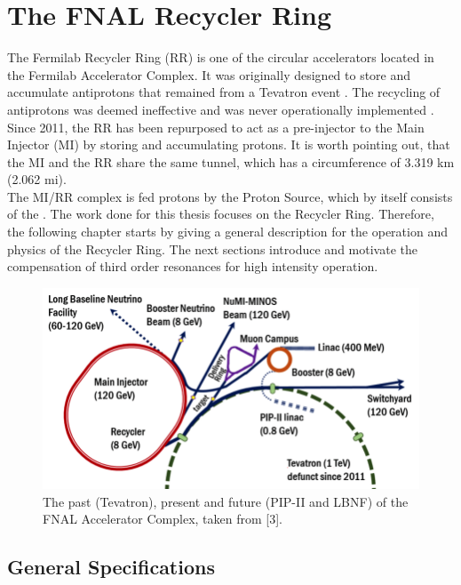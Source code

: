 \chapter{The FNAL Recycler Ring}

The Fermilab Recycler Ring (RR) is one of the circular accelerators located in the Fermilab Accelerator Complex. It was originally designed to store and accumulate antiprotons that remained from a Tevatron event \cite{rr0}. The recycling of antiprotons was deemed ineffective and was never operationally implemented \cite{rrnagaitsev}. Since 2011, the RR has been repurposed to act as a pre-injector to the Main Injector (MI) by storing and accumulating protons. It is worth pointing out, that the MI and the RR share the same tunnel, which has a circumference of 3.319 km (2.062 mi).\\

The MI/RR complex is fed protons by the Proton Source, which by itself consists of the \cite{pipII1}. The work done for this thesis focuses on the Recycler Ring. Therefore, the following chapter starts by giving a general description for the operation and physics of the Recycler Ring. The next sections introduce and motivate the compensation of third order resonances for high intensity operation.     

\begin{figure}[]
   \centering
   \includegraphics[width=\columnwidth]{chapter1/FNAL.png}
   \caption{The past (Tevatron), present and future (PIP-II and LBNF) of the FNAL Accelerator Complex, taken from [3].}
   \label{fig:fnal}
\end{figure}

\section{General Specifications}


